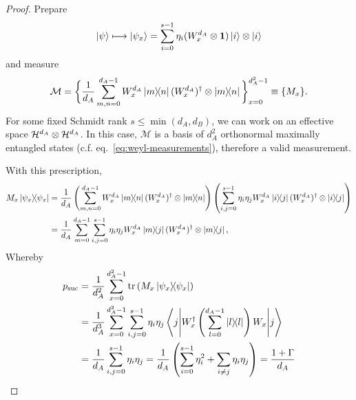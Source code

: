     \purestates*
    \begin{proof}
        Prepare
        $$
            \ket{\psi} \longmapsto \ket{\psi_{x}} = \sum_{i=0}^{s-1} \eta_i (W_x^{d_A} \otimes \mathbf{1}) \ket{i} \otimes \ket{i}
        $$
        and measure
        $$
            \mathcal{M} = \bigg\{ \frac{1}{d_A} \sum_{m,n=0}^{d_A - 1} W_x^{d_A} \ketbra{m}{n} (W_x^{d_A})^\dagger \otimes \ketbra{m}{n} \bigg\}_{x=0}^{d_A^2 - 1} \equiv \{ M_x \} .
        $$
        For some fixed Schmidt rank $s \leq \min(d_A, d_B)$, we can work on an effective space $\mathcal{H}^{d_A} \otimes \mathcal{H}^{d_A}$. In this case, $\mathcal{M}$ is a basis of $d_A^2$ orthonormal maximally entangled states (c.f. eq.~\eqref{eq:weyl-measurements}), therefore a valid measurement.
        
        With this prescription,
        \begin{align*}
            M_x \ketbra{\psi_x}{\psi_x}
			&= \frac{1}{d_A} \left( \sum_{m, n = 0}^{d_A - 1} W_x^{d_A} \ketbra{m}{n} (W_x^{d_A})^\dagger \otimes \ketbra{m}{n} \right) \left( \sum_{i,j=0}^{s - 1} \eta_i \eta_j  W_x^{d_A} \ketbra{i}{j} (W_x^{d_A})^\dagger \otimes \ketbra{i}{j}\right) \\
            &= \frac{1}{d_A} \sum_{m = 0}^{d_A - 1} \sum_{i, j=0}^{s-1} \eta_i \eta_j W_x^{d_A} \ketbra{m}{j} (W_x^{d_A})^\dagger \otimes \ketbra{m}{j} ,
        \end{align*}
        Whereby
        \begin{align*}
            p_{\text{suc}} &= \frac{1}{d_A^2} \sum_{x=0}^{d_A^2 - 1} \text{tr}\left(  M_x \ketbra{\psi_x}{\psi_x}  \right) \\
            &= \frac{1}{d_A^3} \sum_{x=0}^{d_A^2-1} \sum_{i,j = 0}^{s-1} \eta_i \eta_j \left\langle j \middle\vert W_x^\dagger \left( \sum_{l=0}^{d_A - 1} \ketbra{l}{l} \right) W_x \middle\vert j \right\rangle \\
            &= \frac{1}{d_A} \sum_{i,j=0}^{s-1} \eta_i \eta_j = \frac{1}{d_A} \left( \sum_{i=0}^{s-1} \eta_i^2 + \sum_{i \neq j} \eta_i \eta_j \right) = \frac{1 + \Gamma}{d_A}
        \end{align*}
    \end{proof}


